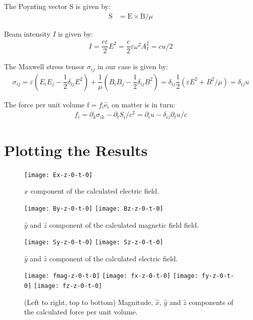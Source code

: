 \documentclass[10pt]{article}
\newcommand{\f}[2]{\dfrac{#1}{#2}} %
\newcommand{\p}[1]{\left(#1\right)} %
\renewcommand{\epsilon}{\varepsilon} %
\renewcommand{\v}[1]{\boldsymbol{\mathrm{#1}}} %
\newcommand{\uv}[1]{\hat{\boldsymbol{\mathrm{#1}}}} %
\renewcommand{\d}{\partial} %
\begin{document}
The Poynting vector $\v S$ is given by:
\begin{align*}
  \v S&=\v E\times\v B/\mu 
\end{align*}

Beam intensity $I$ is given by:
\begin{align*}
  I=\f{c\epsilon}2E^2=\f c2\epsilon\omega^2A_I^2=cu/2
\end{align*}

The Maxwell stress tensor $\sigma_{ij}$ in our case is given by:
\begin{align*}
  \sigma_{ij}=\epsilon\p{E_iE_j-\f12\delta_{ij}E^2}
  +\f1\mu\p{B_iB_j-\f12\delta_{ij}B^2} =\delta_{ij}\f12\p{\epsilon
    E^2+B^2/\mu}=\delta_{ij}u
\end{align*}

The force per unit volume $\v f=f_i\uv e_i$ on matter is in turn:
\begin{align*}
  f_i=\d_k\sigma_{ik}-\d_tS_i/c^2=\d_iu-\delta_{iz}\d_tu/c
\end{align*}





\section*{Plotting the Results}

\begin{figure}[h]
\centering
\texttt{[image: Ex-z-0-t-0]}
\caption{$\hat{x}$ component of the calculated electric field.}
\label{g:Ex}
\end{figure}


\begin{figure}[h]
\centering
\texttt{[image: By-z-0-t-0]}
\texttt{[image: Bz-z-0-t-0]}
\caption{$\hat{y}$ and $\hat{z}$  component of the calculated magnetic field field.}
\label{g:By}
\end{figure}









\begin{figure}[h]
\centering
\texttt{[image: Sy-z-0-t-0]}
\texttt{[image: Sz-z-0-t-0]}
\caption{$\hat{y}$ and $\hat{z}$ component of the calculated electric field.}
\label{g:Sy}
\end{figure}


\begin{figure}[h]
\centering
\texttt{[image: fmag-z-0-t-0]}
\texttt{[image: fx-z-0-t-0]}
\texttt{[image: fy-z-0-t-0]}
\texttt{[image: fz-z-0-t-0]}
\caption{(Left to right, top to bottom) Magnitude, $\hat{x}$, $\hat{y}$ and $\hat{z}$ components of the calculated force per unit volume.}
\label{g:F}
\end{figure}
\end{document}
